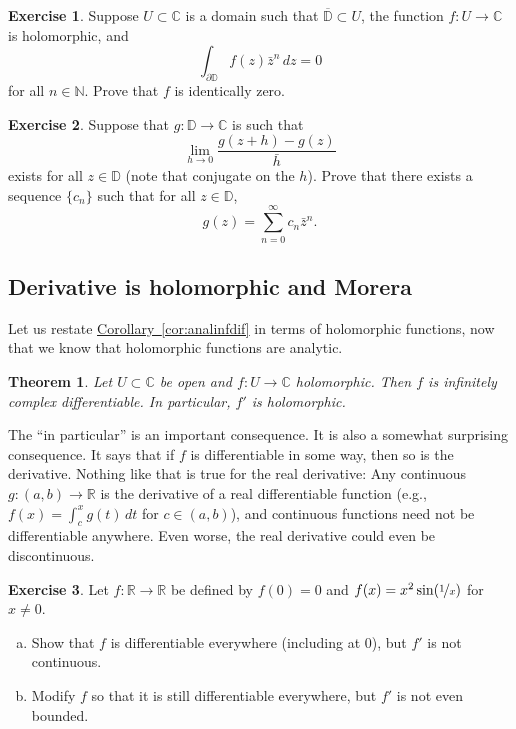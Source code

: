 \documentclass[12pt,openany]{book}
\newcommand{\C}{{\mathbb{C}}}
\newcommand{\R}{{\mathbb{R}}}
\newcommand{\N}{{\mathbb{N}}}
\newcommand{\D}{{\mathbb{D}}}
\newcommand{\myquote}[1]{``#1''}
\theoremstyle{plain}
\newtheorem{thm}{Theorem}[section]
\theoremstyle{remark}
\theoremstyle{definition}
\newenvironment{exbox}{%
    \def\FrameCommand{\vrule width 1pt \relax\hspace{10pt}}%
    \MakeFramed{\advance\hsize-\width\FrameRestore}%
}{%
    \endMakeFramed
}
\newenvironment{exparts}{%
    \leavevmode\begin{enumerate}[a),noitemsep,topsep=0pt,parsep=0pt,partopsep=0pt]
}{%
    \end{enumerate}
}
\theoremstyle{exercise}
\newtheorem{exercise}{Exercise}[section]
\theoremstyle{example}
\newcommand{\corref}[1]{\hyperref[#1]{Corollary~\ref*{#1}}}
\begin{document}
\begin{exbox}
\begin{exercise}
Suppose $U \subset \C$ is a domain such that $\overline{\D} \subset U$,
the function $f \colon U \to \C$ is holomorphic, and
\begin{equation*}
\int_{\partial \D} f(z) \bar{z}^n \, dz = 0
\end{equation*}
for all $n \in \N$.  Prove that $f$ is identically zero.
\end{exercise}

\begin{exercise}
Suppose that $g \colon \D \to \C$ is such that
\begin{equation*}
\lim_{h \to 0}
\frac{g(z+h)-g(z)}{\bar{h}}
\end{equation*}
exists for all $z \in \D$ (note that conjugate on the $h$).
Prove that there exists
a sequence $\{ c_n \}$ such that for all $z \in \D$,
\begin{equation*}
g(z) = \sum_{n=0}^\infty c_n \bar{z}^n .
\end{equation*}
\end{exercise}
\end{exbox}

\subsection{Derivative is holomorphic and Morera}

Let us restate \corref{cor:analinfdif} in terms of
holomorphic functions, now that we know that holomorphic functions are
analytic.

\begin{thm} \label{thm:holfuncinfder}
Let $U \subset \C$ be open and $f \colon U \to \C$ holomorphic.  Then
$f$ is infinitely complex differentiable.  In particular, $f'$ is
holomorphic.
\end{thm}

The \myquote{in particular} is an important consequence.  It is also a somewhat
surprising consequence.
It says that if $f$ is differentiable in some way,
then so is the derivative.  Nothing like that is true for the real
derivative:
Any continuous $g \colon (a,b) \to \R$ is the derivative
of a real differentiable function (e.g., $f(x) = \int_c^x g(t)\,dt$ for $c
\in (a,b)$),
and continuous functions need not be differentiable anywhere.
Even worse, the real derivative could even be discontinuous.

\begin{exbox}
\begin{exercise}
Let $f \colon \R \to \R$ be defined by $f(0) = 0$ and $f(x) = x^2
\sin( \nicefrac{1}{x} )$ for $x \not= 0$.
\begin{exparts}
\item
Show that $f$ is
differentiable everywhere (including at $0$), but $f'$ is not continuous.
\item
Modify $f$ so that it is still differentiable everywhere, but $f'$ is not
even bounded.
\end{exparts}
\end{exercise}
\end{exbox}
\end{document}
